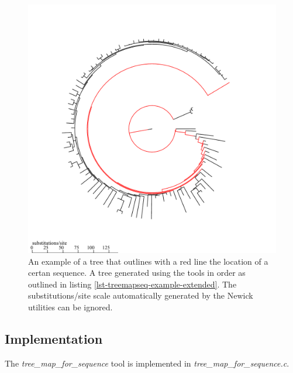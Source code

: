 \begin{figure}
  \includegraphics[scale=0.7]{tree-stroke.pdf}
  \caption{An example of a tree that outlines with a red line the
    location of a certan sequence. A tree generated using the tools in
    order as outlined in listing
    \ref{lst-treemapseq-example-extended}. The substitutions/site
    scale automatically generated by the Newick utilities
    \cite{newick_tools} can be ignored.}
  \label{fig-treemapseq}
\end{figure}

\subsection{Implementation}
The \emph{tree\_map\_for\_sequence} tool is implemented in \newline
\emph{tree\_map\_for\_sequence.c}.

